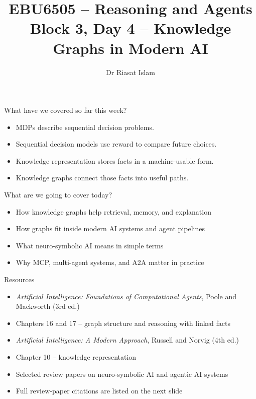 \documentclass[aspectratio=169]{beamer}
\title[EBU6505 B3 D4]{EBU6505 -- Reasoning and Agents\\Block 3, Day 4 -- Knowledge Graphs in Modern AI}
\author{Dr Riasat Islam}
\institute{Queen Mary University of London}
\date{}
\newcommand{\defaultdeckrefs}{AIMA4e Ch.10 pp.314--343; Poole3e Ch.16--17 pp.701--766; doi:10.1016/j.cosrev.2026.100902}
\newcommand{\currentsliderefs}{\defaultdeckrefs}
\newcommand{\setslideref}[1]{\gdef\currentsliderefs{#1}}
\begin{document}
\setslideref{AIMA4e Ch.10 pp.314--343; Poole3e Ch.16--17 pp.701--766; doi:10.1016/j.cosrev.2026.100902}
\begin{frame}
  \titlepage
\end{frame}

\begin{frame}{What have we covered so far this week?}
\begin{itemize}
  \item MDPs describe sequential decision problems.
  \item Sequential decision models use reward to compare future choices.
  \item Knowledge representation stores facts in a machine-usable form.
  \item Knowledge graphs connect those facts into useful paths.
\end{itemize}
\end{frame}

\begin{frame}{What are we going to cover today?}
\begin{itemize}
  \item How knowledge graphs help retrieval, memory, and explanation
  \item How graphs fit inside modern AI systems and agent pipelines
  \item What neuro-symbolic AI means in simple terms
  \item Why MCP, multi-agent systems, and A2A matter in practice
\end{itemize}
\end{frame}

\begin{frame}{Resources}
\small
\begin{itemize}
  \item \textit{Artificial Intelligence: Foundations of Computational Agents}, Poole and Mackworth (3rd ed.)
  \item Chapters 16 and 17 -- graph structure and reasoning with linked facts
  \item \textit{Artificial Intelligence: A Modern Approach}, Russell and Norvig (4th ed.)
  \item Chapter 10 -- knowledge representation
  \item Selected review papers on neuro-symbolic AI and agentic AI systems
  \item Full review-paper citations are listed on the next slide
\end{itemize}
\end{frame}
\end{document}
